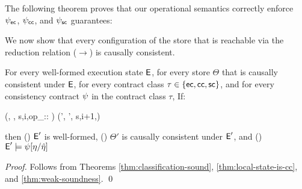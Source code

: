 The following theorem proves that our operational semantics correctly
enforce $\psi_{\sf ec}$, $\psi_{\sf cc}$, and $\psi_{\sf sc}$ guarantees:



We now show that every configuration of the store that is reachable
via the reduction relation ($\xrightarrow{}$) is causally consistent.



\begin{corollary}[Soundness]
  \label{thm:soundness}
  For every well-formed execution state ${\normalfont \textsf{E}}$, for every store $\Theta$
  that is causally consistent under ${\normalfont \textsf{E}}$, for every contract class $\tau
  \in \{{\sf ec},{\sf cc},{\sf sc}\}$, and for every consistency
  contract $\psi$ in the contract class $\tau$, If:
  \begin{smathpar}
  (\E, \Theta, \langle s,i,op_\tau :: 
  \sigma \rangle \pll \Sigma) \xrightarrow{\eff} (\E', \Theta',
  \langle s,i+1,\sigma \rangle \pll \Sigma)
  \end{smathpar}
  then () ${\normalfont \textsf{E}}'$ is well-formed, ()
  $\Theta'$ is causally consistent under ${\normalfont \textsf{E}}'$, and ()
  ${\normalfont \textsf{E}}' \models \psi[\eta/\hat{\eta}]$
\end{corollary}
\begin{proof}
  Follows from Theorems \ref{thm:classification-sound},
  \ref{thm:local-state-is-cc}, and \ref{thm:weak-soundness}.
  \hfill \qed
\end{proof}



